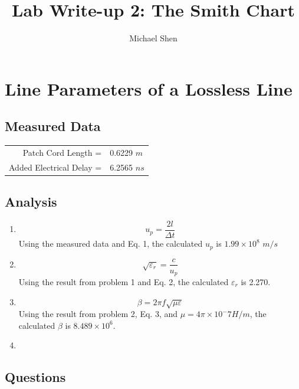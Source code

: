 \documentclass{article}
\begin{document}
\title{Lab Write-up 2: The Smith Chart}
\author{Michael Shen}
\maketitle


\section{Line Parameters of a Lossless Line}

\subsection{Measured Data}

\begin{table}[h]
\centering
	\begin{tabular}{rl}
	Patch Cord Length =  	  & 0.6229 $m$  \\
	Added Electrical Delay =  & 6.2565 $ns$      
	\end{tabular}
\end{table}

\subsection{Analysis}

\begin{enumerate}
	\item 
		\begin{equation}
			u_p = \dfrac{2l}{\Delta t}
		\end{equation}
		Using the measured data and Eq. 1, the calculated $u_p$ is $1.99\times 10^8$ $m/s$
	\item
		\begin{equation}
			\sqrt{\varepsilon_r} = \dfrac{c}{u_p}
		\end{equation}
		Using the result from problem 1 and Eq. 2, the calculated $\varepsilon_r$ is 2.270.
	\item
		\begin{equation}
			\beta = 2\pi f\sqrt{\mu\varepsilon}
		\end{equation}
		Using the result from problem 2, Eq. 3, and $\mu = 4\pi\times 10^-7 H/m$, the calculated $\beta$ is $8.489\times 10^6$.
	\item
\end{enumerate}

\subsection{Questions}
\end{document}
